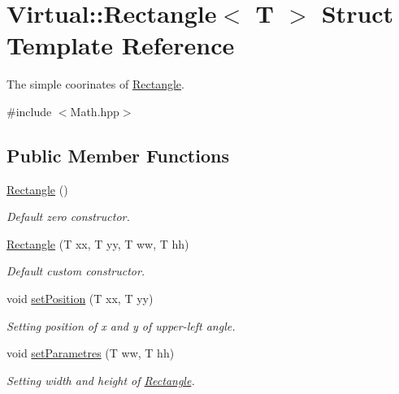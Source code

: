 \hypertarget{struct_virtual_1_1_rectangle}{}\section{Virtual\+:\+:Rectangle$<$ T $>$ Struct Template Reference}
\label{struct_virtual_1_1_rectangle}


The simple coorinates of \hyperlink{struct_virtual_1_1_rectangle}{Rectangle}.  




{\ttfamily \#include $<$Math.\+hpp$>$}

\subsection*{Public Member Functions}
\begin{DoxyCompactItemize}
\item 
\hyperlink{struct_virtual_1_1_rectangle_ae2d69ec79c6caf39973a5226995d5437}{Rectangle} ()
\begin{DoxyCompactList}\small\item\em Default zero constructor. \end{DoxyCompactList}\item 
\hyperlink{struct_virtual_1_1_rectangle_a7cb26cfb2eee27a70fa1e7cae997c72c}{Rectangle} (T xx, T yy, T ww, T hh)
\begin{DoxyCompactList}\small\item\em Default custom constructor. \end{DoxyCompactList}\item 
void \hyperlink{struct_virtual_1_1_rectangle_abe71777391c0d70a523bde7be00054df}{set\+Position} (T xx, T yy)
\begin{DoxyCompactList}\small\item\em Setting position of x and y of upper-\/left angle. \end{DoxyCompactList}\item 
void \hyperlink{struct_virtual_1_1_rectangle_a7894397b7dc0a3ef61b5dfd26e40dcfa}{set\+Parametres} (T ww, T hh)
\begin{DoxyCompactList}\small\item\em Setting width and height of \hyperlink{struct_virtual_1_1_rectangle}{Rectangle}. \end{DoxyCompactList}\end{DoxyCompactItemize}
